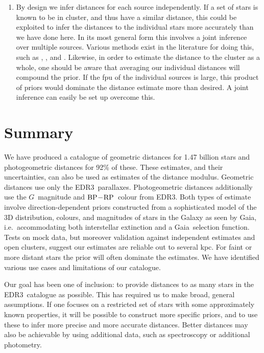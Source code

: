 \documentclass[twocolumn]{aastex62}
\providecommand{\gaia}{Gaia}
\providecommand{\release}{EDR3}
\providecommand{\gmag}{\ensuremath{G}}
\providecommand{\bprp}{\ensuremath{{\rm BP} \! - \! {\rm RP}}}
\begin{document}
\begin{enumerate}
\item By design we infer distances for each source independently. If a set of stars is known to be in cluster, and thus have a similar distance, this could be exploited to infer the distances to the individual stars
  more accurately than we have done here.
  In its most general form this involves a joint inference over multiple sources.
Various methods exist in the literature for doing this, such as \cite{2014A&A...564A..49P}, \cite{2018A&A...618A..93C}, and \cite{2020arXiv201000272O}.
Likewise, in order to estimate the distance to the cluster as a whole, one should be aware that averaging our individual distances
will compound the prior. If the fpu of the individual sources is large, this product of priors would dominate the distance estimate more than desired. A joint inference can easily be set up overcome this.
  
\end{enumerate}



\vspace*{1em}
\section{Summary}\label{sec:summary}

We have produced a catalogue of geometric distances for 1.47 billion stars and photogeometric distances for 92\% of these. These estimates, and their uncertainties, can also be used as estimates of the distance modulus. Geometric distances use only the \release\ parallaxes. Photogeometric distances additionally use the \gmag\ magnitude and \bprp\ colour from \release.
Both types of estimate involve direction-dependent priors constructed from a sophisticated model of the 3D distribution, colours, and magnitudes of stars in the Galaxy as seen by \gaia, i.e.\ accommodating both interstellar extinction and a \gaia\ selection function.
Tests on mock data, but moreover validation against independent estimates and open clusters, suggest our estimates are reliable out to several kpc. 
For faint or more distant stars the prior will often dominate the estimates. We have identified various use cases and limitations of our catalogue.

Our goal has been one of inclusion: to provide distances to as many stars in the \release\ catalogue as possible. This has required us to make broad, general assumptions. If one focuses on a restricted set of stars with some approximately known properties, it will be possible to construct more specific priors, and to use these to infer more precise and more accurate distances. Better distances may also be achievable by using additional data, such as spectroscopy or additional photometry. 
\end{document}
